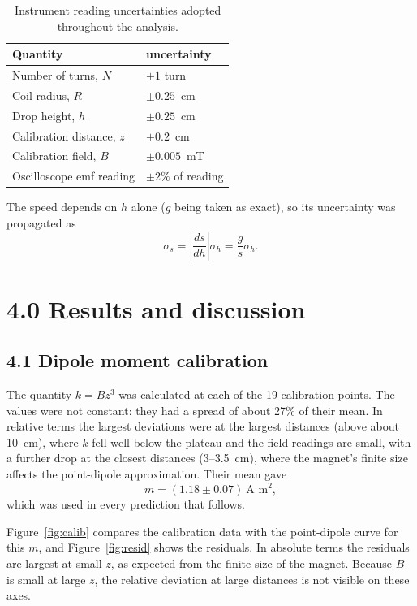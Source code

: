 \documentclass[11pt]{article}
\begin{document}
\begin{table}
\centering
\caption{Instrument reading uncertainties adopted throughout the analysis.}
\label{tab:unc}
\begin{tabular}{ll}
\toprule
\textbf{Quantity} & \textbf{uncertainty} \\
\midrule
Number of turns, $N$ & $\pm 1$ turn \\
Coil radius, $R$ & $\pm 0.25$~cm \\
Drop height, $h$ & $\pm 0.25$~cm \\
Calibration distance, $z$ & $\pm 0.2$~cm \\
Calibration field, $B$ & $\pm 0.005$~mT \\
Oscilloscope emf reading & $\pm 2\%$ of reading \\
\bottomrule
\end{tabular}
\end{table}

The speed depends on $h$ alone ($g$ being taken as exact), so its uncertainty was propagated as
\begin{equation}
\sigma_s = \left|\frac{ds}{dh}\right|\sigma_h = \frac{g}{s}\sigma_h .
\end{equation}

\section*{4.0 Results and discussion}

\subsection*{4.1 Dipole moment calibration}
The quantity $k = Bz^3$ was calculated at each of the 19 calibration points. The values were not constant: they had a spread of about 27\% of their mean. In relative terms the largest deviations were at the largest distances (above about 10~cm), where $k$ fell well below the plateau and the field readings are small, with a further drop at the closest distances (3--3.5~cm), where the magnet's finite size affects the point-dipole approximation. Their mean gave
\begin{equation}
m = (1.18 \pm 0.07)~\text{A m}^2 ,
\end{equation}
which was used in every prediction that follows.

Figure~\ref{fig:calib} compares the calibration data with the point-dipole curve for this $m$, and Figure~\ref{fig:resid} shows the residuals. In absolute terms the residuals are largest at small $z$, as expected from the finite size of the magnet. Because $B$ is small at large $z$, the relative deviation at large distances is not visible on these axes.
\end{document}
